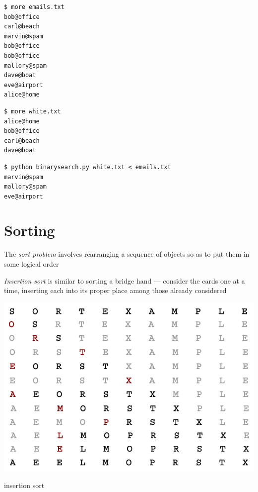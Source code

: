 \documentclass[8pt,a4paper,compress,handout]{beamer}
\begin{document}
\begin{frame}[fragile]
\begin{lstlisting}[language={}]
$ more emails.txt 
bob@office
carl@beach
marvin@spam
bob@office
bob@office
mallory@spam
dave@boat
eve@airport
alice@home
\end{lstlisting}

\begin{lstlisting}[language={}]
$ more white.txt
alice@home
bob@office
carl@beach
dave@boat
\end{lstlisting}

\begin{lstlisting}[language={}]
$ python binarysearch.py white.txt < emails.txt 
marvin@spam
mallory@spam
eve@airport
\end{lstlisting}
\end{frame}

\section{Sorting}
\begin{frame}[fragile]
The \emph{sort problem} involves rearranging a sequence of objects so as to put them in some logical order

\bigskip

\emph{Insertion sort} is similar to sorting a bridge hand --- consider the cards one at a time, inserting each into its proper place among those already considered
\begin{center}
\includegraphics[scale=0.3]{figures/insertion.png}

\smallskip

\tiny insertion sort
\end{center}
\end{frame}
\end{document}
